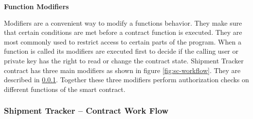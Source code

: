 \textbf{Function Modifiers}

Modifiers are a convenient way to modify a functions behavior. They make sure that certain conditions are met before a contract function is executed. They are most commonly used to restrict access to certain parts of the program. When a function is called its modifiers are executed first to decide if the calling user or private key has the right to read or change the contract state. Shipment Tracker contract has three main modifiers as shown in figure \ref{fig:sc-workflow}. They are described in \ref{CWF}. Together these three modifiers perform authorization checks on different functions of the smart contract.
\clearpage

\subsubsection{Shipment Tracker – Contract Work Flow} \label{CWF}
